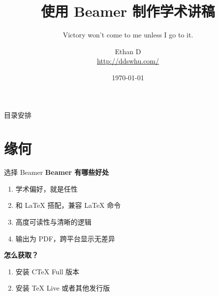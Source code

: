 \documentclass[10pt]{beamer}
\begin{document}
\title[使用 Beamer 制作学术讲稿]{\bfseries 使用 Beamer 制作学术讲稿}
\subtitle{\small Victory won\rq{}t come to me unless I go to it.}
\author[Ethan D.]{\small Ethan D \\{\color{erlangenblue}\url{http://ddswhu.com/}}}
\date{\today}

\begin{frame}[plain]
\titlepage
\end{frame}


\begin{frame}{目录安排}
  \tableofcontents
\end{frame}


\section{缘何}
\begin{frame}{选择 Beamer}
\noindent\textbf{Beamer 有哪些好处}
  \begin{enumerate}
    \item 学术偏好，就是任性
    \item 和 \LaTeX{} 搭配，兼容 \LaTeX{} 命令
    \item 高度可读性与清晰的逻辑
    \item 输出为 PDF，跨平台显示无差异
  \end{enumerate}
\textbf{怎么获取？}
\begin{enumerate}
  \item 安装 CTeX Full 版本
  \item 安装 TeX Live 或者其他发行版
\end{enumerate}

\end{frame}



  
\end{document}
